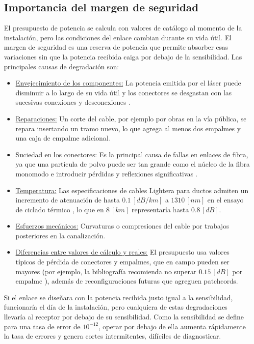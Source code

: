 \subsection{Importancia del margen de seguridad}
\label{sec_5.3}
El presupuesto de potencia se calcula con valores de catálogo al momento de la instalación, pero las condiciones del enlace cambian durante su vida útil. El margen de seguridad es una reserva de potencia que permite absorber esas variaciones sin que la potencia recibida caiga por debajo de la sensibilidad. Las principales causas de degradación son:
\begin{itemize}
    \item \underline{Envejecimiento de los componentes:} La potencia emitida por el láser puede disminuir a lo largo de su vida útil y los conectores se desgastan con las sucesivas conexiones y desconexiones \cite{b7}.
    \item \underline{Reparaciones:} Un corte del cable, por ejemplo por obras en la vía pública, se repara insertando un tramo nuevo, lo que agrega al menos dos empalmes y una caja de empalme adicional.
    \item \underline{Suciedad en los conectores:} Es la principal causa de fallas en enlaces de fibra, ya que una partícula de polvo puede ser tan grande como el núcleo de la fibra monomodo e introducir pérdidas y reflexiones significativas \cite{b17}.
    \item \underline{Temperatura:} Las especificaciones de cables Lightera para ductos admiten un incremento de atenuación de hasta $0.1 \, [dB/km]$ a $1310 \, [nm]$ en el ensayo de ciclado térmico \cite{b8}, lo que en $8 \, [km]$ representaría hasta $0.8 \, [dB]$.
    \item \underline{Esfuerzos mecánicos:} Curvaturas o compresiones del cable por trabajos posteriores en la canalización.
    \item \underline{Diferencias entre valores de cálculo y reales:} El presupuesto usa valores típicos de pérdida de conectores y empalmes, que en campo pueden ser mayores (por ejemplo, la bibliografía recomienda no superar $0.15 \, [dB]$ por empalme \cite{b7}), además de reconfiguraciones futuras que agreguen patchcords.
\end{itemize}

Si el enlace se diseñara con la potencia recibida justo igual a la sensibilidad, funcionaría el día de la instalación, pero cualquiera de estas degradaciones llevaría al receptor por debajo de su sensibilidad. Como la sensibilidad se define para una tasa de error de $10^{-12}$, operar por debajo de ella aumenta rápidamente la tasa de errores y genera cortes intermitentes, difíciles de diagnosticar.

